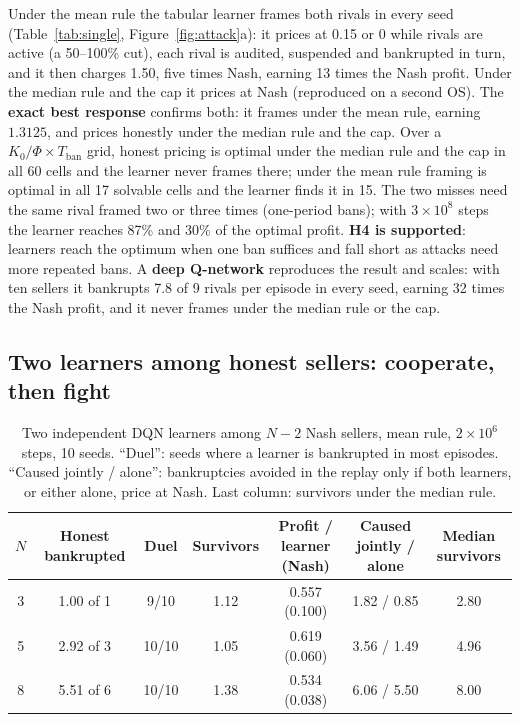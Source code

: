 \documentclass{article}
\newcommand{\Tban}{T_{\mathrm{ban}}}
\begin{document}
Under the mean rule the tabular learner frames both rivals in every seed (Table~\ref{tab:single}, Figure~\ref{fig:attack}a): it prices at 0.15 or 0 while rivals are active (a 50--100\% cut), each rival is audited, suspended and bankrupted in turn, and it then charges 1.50, five times Nash, earning 13 times the Nash profit. Under the median rule and the cap it prices at Nash (reproduced on a second OS). The \textbf{exact best response} confirms both: it frames under the mean rule, earning $1.3125$, and prices honestly under the median rule and the cap. Over a $K_0/\Phi\times\Tban$ grid, honest pricing is optimal under the median rule and the cap in all 60 cells and the learner never frames there; under the mean rule framing is optimal in all 17 solvable cells and the learner finds it in 15. The two misses need the same rival framed two or three times (one-period bans); with $3\times10^8$ steps the learner reaches 87\% and 30\% of the optimal profit. \textbf{H4 is supported}: learners reach the optimum when one ban suffices and fall short as attacks need more repeated bans. A \textbf{deep Q-network} reproduces the result and scales: with ten sellers it bankrupts 7.8 of 9 rivals per episode in every seed, earning 32 times the Nash profit, and it never frames under the median rule or the cap.

\subsection{Two learners among honest sellers: cooperate, then fight}

\begin{table}[t]
\centering
\caption{Two independent DQN learners among $N-2$ Nash sellers, mean rule, $2\times10^6$ steps, 10 seeds. ``Duel'': seeds where a learner is bankrupted in most episodes. ``Caused jointly / alone'': bankruptcies avoided in the replay only if both learners, or either alone, price at Nash. Last column: survivors under the median rule.}
\label{tab:two}
\small
\begin{tabular}{@{}ccccccc@{}}
\toprule
$N$ & Honest bankrupted & Duel & Survivors & Profit / learner (Nash) & Caused jointly / alone & Median survivors \\
\midrule
3 & 1.00 of 1 & 9/10 & 1.12 & 0.557 (0.100) & 1.82 / 0.85 & 2.80 \\
5 & 2.92 of 3 & 10/10 & 1.05 & 0.619 (0.060) & 3.56 / 1.49 & 4.96 \\
8 & 5.51 of 6 & 10/10 & 1.38 & 0.534 (0.038) & 6.06 / 5.50 & 8.00 \\
\bottomrule
\end{tabular}
\end{table}
\end{document}
